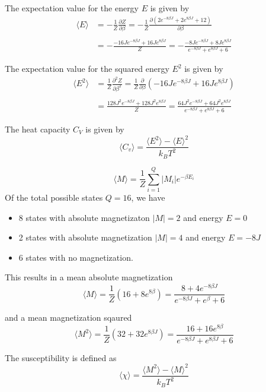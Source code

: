\documentclass[10pt,a4paper]{article}
\begin{document}
The expectation value for the energy $E$ is given by
\begin{equation}\begin{split}
\langle E \rangle &= -\frac{1}{Z}\frac{\partial Z}{\partial\beta} = -\frac{1}{Z} \frac{\partial (2e^{-8\beta J} + 2e^{8\beta J} + 12)}{\partial \beta}\\\\
&= -\frac{-16Je^{-8\beta J} + 16Je^{8\beta J}}{Z} = -\frac{-8Je^{-8\beta J} + 8Je^{8\beta J}}{e^{-8\beta J} + e^{8\beta J} + 6}
\end{split}\end{equation}

The expectation value for the squared energy $E^2$ is given by
\begin{equation}\begin{split}
\langle E^2 \rangle &= \frac{1}{Z}\frac{\partial^2 Z}{\partial\beta^2} = \frac{1}{Z}\frac{\partial}{\partial\beta}\left(-16Je^{-8\beta J} + 16Je^{8\beta J} \right)\\\\
&= \frac{128J^2e^{-8\beta J} + 128J^2e^{8\beta J}}{Z} = \frac{64J^2e^{-8\beta J} + 64J^2e^{8\beta J}}{e^{-8\beta J}+e^{8\beta J} + 6}
\end{split}\end{equation}


The heat capacity $C_V$ is given by
\begin{equation}
\langle C_v \rangle = \frac{\langle E^2 \rangle - \langle E \rangle ^2}{k_B T^2}
\end{equation}


\begin{equation}
\langle M \rangle = \frac{1}{Z} \sum\limits_{i=1}^Q |M_i| e^{-\beta E_i}
\end{equation}
Of the total possible states $Q = 16$, we have
\begin{itemize}
\item 8 states with absolute magnetizaton $|M| = 2$ and energy $E = 0$
\item 2 states with absolute magnetization $|M| = 4$ and energy $E = -8J$
\item 6 states with no magnetization.
\end{itemize}
This results in a mean absolute magnetization
\begin{equation}
\langle M \rangle = \frac{1}{Z} (16+8e^{8\beta}) = \frac{8+4e^{-8\beta J}}{e^{-8\beta J} + e^{\beta} + 6}
\end{equation}

and a mean magnetization sqaured
\begin{equation}
\langle M^2 \rangle = \frac{1}{Z} (32+32e^{8\beta J}) = \frac{16 + 16e^{8\beta}}{e^{-8\beta J} + e^{8\beta J} + 6}
\end{equation}

The susceptibility is defined as
\begin{equation}
\langle \chi \rangle = \frac{\langle M^2 \rangle - \langle M \rangle ^2}{k_B T^2}
\end{equation}






\printbibliography %
\end{document}
